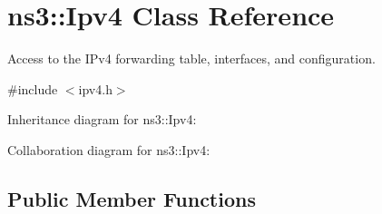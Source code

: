 \hypertarget{classns3_1_1Ipv4}{}\section{ns3\+:\+:Ipv4 Class Reference}
\label{classns3_1_1Ipv4}


Access to the I\+Pv4 forwarding table, interfaces, and configuration.  




{\ttfamily \#include $<$ipv4.\+h$>$}



Inheritance diagram for ns3\+:\+:Ipv4\+:


Collaboration diagram for ns3\+:\+:Ipv4\+:
\subsection*{Public Member Functions}
